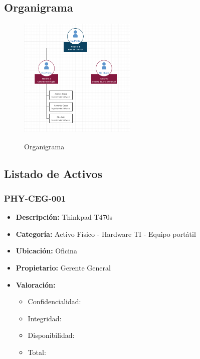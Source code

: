 \documentclass[11pt]{utalcaDoc}
\begin{document}
\subsection{Organigrama}
\begin{figure}[ht]
    \centering
    \caption{Organigrama}
    \includegraphics[width=0.5\textwidth]{organigrama.png}
    \label{FIG:ORGANIGRAMA}
\end{figure}

\subsection{Listado de Activos}

\subsubsection{PHY-CEG-001}
\begin{itemize}
    \item {\textbf{Descripción:}   Thinkpad T470s }
    \item {\textbf{Categoría:}     Activo Físico - Hardware TI - Equipo portátil}
    \item {\textbf{Ubicación:}     Oficina }
    \item {\textbf{Propietario:}   Gerente General }
    \item {\textbf{Valoración:}
          \begin{itemize}
              \item Confidencialidad:
              \item Integridad:
              \item Disponibilidad:
              \item Total:
          \end{itemize}
          }
\end{itemize}
\end{document}
